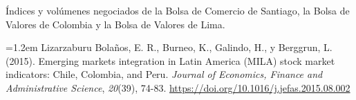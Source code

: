 \documentclass{article}
\newcommand{\smallsize}{\fontsize{24.6}{32.0}\selectfont}
\begin{document}
\vfill
\begin{tcolorbox}[enhanced, sharp corners, colback=navy, boxrule=0pt, width=\paperwidth,
  left=34mm, right=34mm, top=14mm, bottom=11mm,
  overlay={\fill[gold] (frame.north west) rectangle ([yshift=-5mm]frame.north east);}]
\begin{minipage}[c]{245mm}\raggedright
{\color{acento}\smallsize\bfseries{}}\par\vspace{5mm}
{\color{white}\smallsize Índices y volúmenes negociados de la Bolsa de Comercio de Santiago, la Bolsa de Valores de Colombia y la Bolsa de Valores de Lima.}
\end{minipage}\hfill
\begin{minipage}[c]{385mm}\raggedright
{\color{acento}\smallsize\bfseries{}}\par\vspace{5mm}
{\color{white}\smallsize\hangindent=1.2em Lizarzaburu Bolaños, E. R., Burneo, K., Galindo, H., y Berggrun, L. (2015). Emerging markets integration in Latin America (MILA) stock market indicators: Chile, Colombia, and Peru. \textit{Journal of Economics, Finance and Administrative Science}, \textit{20}(39), 74-83. \url{https://doi.org/10.1016/j.jefas.2015.08.002}\par}
\end{minipage}\hfill
\begin{minipage}[c]{100mm}\centering
{}\par\vspace{4mm}
{\color{acento}\fontsize{17}{21}\selectfont\bfseries{}}
\end{minipage}
\end{tcolorbox}
\end{document}

